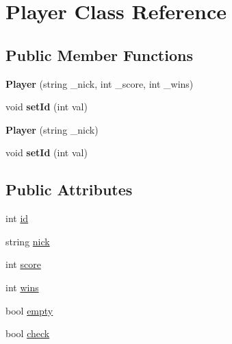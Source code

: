 \hypertarget{classPlayer}{\section{Player Class Reference}
\label{classPlayer}
}
\subsection*{Public Member Functions}
\begin{DoxyCompactItemize}
\item 
\hypertarget{classPlayer_a7e73d9e077fb15be7af8baf6e8924d6c}{{\bfseries Player} (string \-\_\-nick, int \-\_\-score, int \-\_\-wins)}\label{classPlayer_a7e73d9e077fb15be7af8baf6e8924d6c}

\item 
\hypertarget{classPlayer_aae48749805799debc558ad74c2cfbc8d}{void {\bfseries set\-Id} (int val)}\label{classPlayer_aae48749805799debc558ad74c2cfbc8d}

\item 
\hypertarget{classPlayer_aa206440e032fa4a2ff1ea4ebf7814897}{{\bfseries Player} (string \-\_\-nick)}\label{classPlayer_aa206440e032fa4a2ff1ea4ebf7814897}

\item 
\hypertarget{classPlayer_aae48749805799debc558ad74c2cfbc8d}{void {\bfseries set\-Id} (int val)}\label{classPlayer_aae48749805799debc558ad74c2cfbc8d}

\end{DoxyCompactItemize}
\subsection*{Public Attributes}
\begin{DoxyCompactItemize}
\item 
int \hyperlink{classPlayer_a05e05f3a23de78da7ec032ec2bcf8c6c}{id}
\item 
string \hyperlink{classPlayer_aea2f8abddadf8deb423a3c9b507d1ccc}{nick}
\item 
int \hyperlink{classPlayer_ace6abae8d66534ad0a1fd6458f786a6e}{score}
\item 
int \hyperlink{classPlayer_aba7987685c25a4189ae664e9748eecf0}{wins}
\item 
bool \hyperlink{classPlayer_a8039b9f17594c036c3bd7b676a24b19e}{empty}
\item 
bool \hyperlink{classPlayer_a1b72316124caf757250c3cee1c4416ff}{check}
\end{DoxyCompactItemize}


